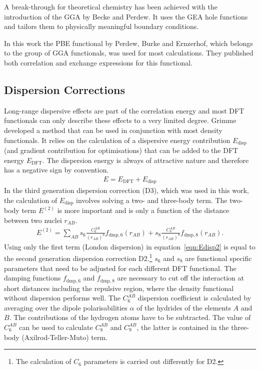 A break-through for theoretical chemistry has been achieved with the
introduction of the \ac{GGA} by Becke and Perdew. It uses the \ac{GEA} hole functions and tailors
them to physically meaningful boundary conditions. 

In this work the PBE functional by Perdew, Burke and Ernzerhof\autocite{Perdew_GeneralizedGradientApproximation_1996,Perdew_GeneralizedGradientApproximation_1997},
which belongs to the group of \ac{GGA} functionals, was used for most
calculations. They published both correlation and exchange expressions for
this functional.

\subsection{Dispersion Corrections}
\label{sec:dispersioncorrections}

Long-range dispersive effects are part of the correlation energy and most
\ac{DFT} functionals can only describe these effects to a very limited degree.
Grimme \citeauthor{Grimme_consistentaccurateinitio_2010} developed a method that can
be used in conjunction with most density
functionals.\autocite{Grimme_consistentaccurateinitio_2010} It relies on the
calculation of a dispersive energy contribution $E_\text{disp}$ (and gradient
contribution for optimisations) that can be added to the \ac{DFT} energy
$E_\text{DFT}$. The dispersion energy is always of attractive nature and
therefore has a negative sign by convention.
%
\begin{align}
	E = E_\text{DFT} + E_\text{disp}
\end{align}
%
In the third generation dispersion correction (D3), which was used in this work,
the calculation of $E_\text{disp}$ involves solving a two- and three-body term.
The two-body term $E^{(2)}$ is more important and is only a function of the
distance between two nuclei $r_{AB}$.
%
\begin{align}
	E^{(2)}=\sum\limits_{AB}s_6\frac{C_6^{AB}}{\left(r_{AB}\right)^6}f_{\text{dmp},6}(r_{AB}) + s_8\frac{C_8^{AB}}{\left(r_{AB}\right)^8}f_{\text{dmp},8}(r_{AB}).\label{eqn:Edisp2}
\end{align}
%
Using only the first term (London dispersion) in equation~\eqref{eqn:Edisp2} is equal to the
second generation dispersion correction D2.\footnote{The calculation of $C_6$
parameters is carried out differently for D2.} $s_6$ and $s_8$ are functional
specific parameters that need to be adjusted for each different \ac{DFT}
functional. The damping functions $f_{\text{dmp},6}$ and $f_{\text{dmp},8}$ are
necessary to cut off the interaction at short distances including the repulsive
region, where the density functional without dispersion performs well. The $C_6^{AB}$
dispersion coefficient is calculated by averaging over the dipole
polarisabilities $\alpha$ of the hydrides of the elements $A$ and $B$. The
contributions of the hydrogen atoms have to be subtracted. The value of
$C_6^{AB}$ can be used to calculate $C_8^{AB}$ and $C_9^{AB}$, the latter is
contained in the three-body (Axilrod-Teller-Muto) term.

